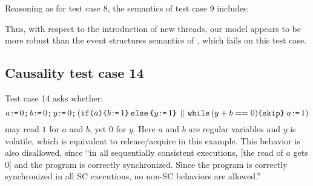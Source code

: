 Reasoning as for test case 8, the semantics of test case 9 includes:
\begin{tikzdisplay}[node distance=1em]
\end{tikzdisplay}

Thus, with respect to the introduction of new threads, our model appears to
be more robust than the event structures semantics of
\cite{DBLP:conf/lics/JeffreyR16}, which fails on this test case.

\subsection{Causality test case 14}

Test case 14 asks whether:
\begin{displaymath}
   a\texttt{:}\mkern-1mu\texttt{=}\, 0\texttt{;}\,\allowbreak
   b\texttt{:}\mkern-1mu\texttt{=}\, 0\texttt{;}\,\allowbreak
   y\texttt{:}\mkern-1mu\texttt{=}\, 0\texttt{;}\,\allowbreak
  (\texttt{if}\allowbreak\texttt{(}a\texttt{)}\allowbreak\texttt{\{} b\texttt{:}\mkern-1mu\texttt{=}\, 1\texttt{\}}\,\allowbreak\texttt{else}\allowbreak\,\texttt{\{} y\texttt{:}\mkern-1mu\texttt{=}\, 1\texttt{\}} 
  \,\mathbin{\|}\,
  \texttt{while}\,(y+b==0) \allowbreak\texttt{\{}\texttt{skip}\texttt{\}}\; a\texttt{:}\mkern-1mu\texttt{=}\,1)
\end{displaymath}
may read $1$ for $a$ and $b$, yet $0$ for $y$.  Here $a$ and $b$ are regular
variables and $y$ is volatile, which is equivalent to release/acquire in this
example.  This behavior is also disallowed, since ``in all sequentially
consistent executions, [the read of $a$ gets $0$] and the program is
correctly synchronized. Since the program is correctly synchronized in all SC
executions, no non-SC behaviors are allowed.''

